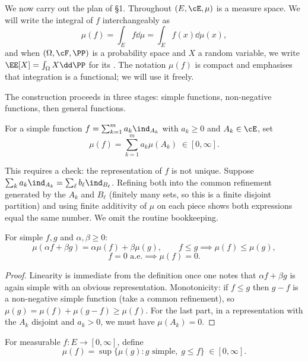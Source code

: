 We now carry out the plan of \S1. Throughout $(E,\cE,\mu)$ is a measure space. We will write the integral of $f$ interchangeably as
$$
\mu(f) = \int_E f \dd\mu = \int_E f(x) \dd\mu(x),
$$
and when $(\Omega,\cF,\PP)$ is a probability space and $X$ a random variable, we write $\EE[X] = \int_\Omega X \dd\PP$ for its . The notation $\mu(f)$ is compact and emphasises that integration is a functional; we will use it freely.

The construction proceeds in three stages: simple functions, non-negative functions, then general functions.

\begin{definition}
	For a simple function $f = \sum_{k=1}^m a_k \ind_{A_k}$ with $a_k \geq 0$ and $A_k \in \cE$, set
	$$
	\mu(f) = \sum_{k=1}^m a_k \mu(A_k) \; \in [0,\infty].
	$$
\end{definition}

This requires a check: the representation of $f$ is not unique. Suppose $\sum_k a_k \ind_{A_k} = \sum_\ell b_\ell \ind_{B_\ell}$. Refining both into the common refinement generated by the $A_k$ and $B_\ell$ (finitely many sets, so this is a finite disjoint partition) and using finite additivity of $\mu$ on each piece shows both expressions equal the same number. We omit the routine bookkeeping.

\begin{proposition}\label{prop:int-simple}
	For simple $f,g$ and $\alpha,\beta \geq 0$:
	$$
	\mu(\alpha f + \beta g) = \alpha\mu(f) + \beta\mu(g), \qquad f \leq g \implies \mu(f) \leq \mu(g),
	$$
	$$
	f = 0 \text{ a.e.} \implies \mu(f) = 0.
	$$
\end{proposition}
\begin{proof}
	Linearity is immediate from the definition once one notes that $\alpha f + \beta g$ is again simple with an obvious representation. Monotonicity: if $f \leq g$ then $g - f$ is a non-negative simple function (take a common refinement), so $\mu(g) = \mu(f) + \mu(g-f) \geq \mu(f)$. For the last part, in a representation with the $A_k$ disjoint and $a_k > 0$, we must have $\mu(A_k) = 0$.
\end{proof}

\begin{definition}
	For measurable $f : E \to [0,\infty]$, define
	$$
	\mu(f) = \sup\{ \mu(g) : g \text{ simple}, \; g \leq f \} \; \in [0,\infty].
	$$
\end{definition}

